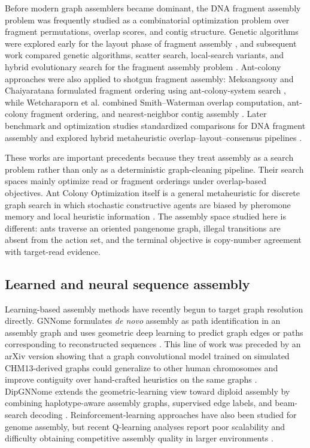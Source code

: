 \documentclass[11pt]{article}
\begin{document}
Before modern graph assemblers became dominant, the DNA fragment assembly problem was frequently studied as a combinatorial optimization problem over fragment permutations, overlap scores, and contig structure. Genetic algorithms were explored early for the layout phase of fragment assembly \citep{parsons1995genetic}, and subsequent work compared genetic algorithms, scatter search, local-search variants, and hybrid evolutionary search for the fragment assembly problem \citep{luque2005metaheuristics,alba2008hybrid}. Ant-colony approaches were also applied to shotgun fragment assembly: Meksangsouy and Chaiyaratana formulated fragment ordering using ant-colony-system search \citep{meksangsouy2003dna}, while Wetcharaporn et al. combined Smith--Waterman overlap computation, ant-colony fragment ordering, and nearest-neighbor contig assembly \citep{wetcharaporn2006dna}. Later benchmark and optimization studies standardized comparisons for DNA fragment assembly and explored hybrid metaheuristic overlap--layout--consensus pipelines \citep{mallen2013benchmark,uzma2020optimizing}.

These works are important precedents because they treat assembly as a search problem rather than only as a deterministic graph-cleaning pipeline. Their search spaces mainly optimize read or fragment orderings under overlap-based objectives. Ant Colony Optimization itself is a general metaheuristic for discrete graph search in which stochastic constructive agents are biased by pheromone memory and local heuristic information \citep{dorigo1997acs,dorigo2004aco,blum2005aco}. The assembly space studied here is different: ants traverse an oriented pangenome graph, illegal transitions are absent from the action set, and the terminal objective is copy-number agreement with target-read evidence.

\subsection{Learned and neural sequence assembly}

Learning-based assembly methods have recently begun to target graph resolution directly. GNNome formulates \emph{de novo} assembly as path identification in an assembly graph and uses geometric deep learning to predict graph edges or paths corresponding to reconstructed sequences \citep{vrcek2025gnnome}. This line of work was preceded by an arXiv version showing that a graph convolutional model trained on simulated CHM13-derived graphs could generalize to other human chromosomes and improve contiguity over hand-crafted heuristics on the same graphs \citep{vrcek2022untangle}. DipGNNome extends the geometric-learning view toward diploid assembly by combining haplotype-aware assembly graphs, supervised edge labels, and beam-search decoding \citep{schmitz2025dipgnnome}. Reinforcement-learning approaches have also been studied for genome assembly, but recent Q-learning analyses report poor scalability and difficulty obtaining competitive assembly quality in larger environments \citep{padovani2025rlassembly}.
\end{document}

